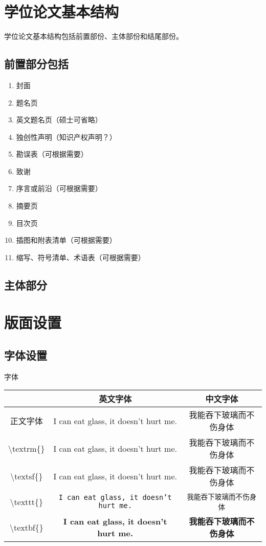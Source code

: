 \chapter{学位论文基本结构}
学位论文基本结构包括前置部份、主体部份和结尾部份。
\section{前置部分包括}
\begin{enumerate}
	\item 封面
	\item 题名页
	\item 英文题名页（硕士可省略）
	\item 独创性声明（知识产权声明？）
	\item 勘误表（可根据需要）
	\item 致谢
	\item 序言或前沿（可根据需要）
	\item 摘要页
	\item 目次页
	\item 插图和附表清单（可根据需要）
	\item 缩写、符号清单、术语表（可根据需要）
\end{enumerate}
\section{主体部分}

\chapter{版面设置}
\section{字体设置}
字体

\begin{tabular}{|c|c|c|}
	\hline  		& 英文字体 & 中文字体  \\
	\hline 正文字体 & I can eat glass, it doesn't hurt me. & 我能吞下玻璃而不伤身体 \\
	\hline  \textbackslash textrm\{\} & \textrm{I can eat glass, it doesn't hurt me.} & \textrm{我能吞下玻璃而不伤身体} \\
	\hline  \textbackslash textsf\{\} & \textsf{I can eat glass, it doesn't hurt me.} & \textsf{我能吞下玻璃而不伤身体} \\
	\hline  \textbackslash texttt\{\} & \texttt{I can eat glass, it doesn't hurt me.} & \texttt{我能吞下玻璃而不伤身体} \\
	\hline  \textbackslash textbf\{\} & \textbf{I can eat glass, it doesn't hurt me.} & \textbf{我能吞下玻璃而不伤身体} \\
	\hline
\end{tabular}

